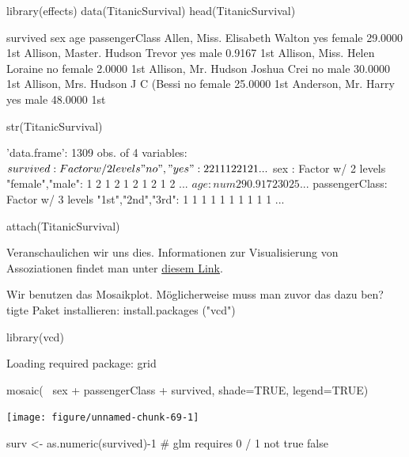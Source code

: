 \documentclass[a4paper,twoside]{tufte-book}\usepackage[]{graphicx}\usepackage[]{color}
\begin{document}
\begin{appendices}
\begin{Schunk}
\begin{Sinput}
library(effects) 
data(TitanicSurvival)
head(TitanicSurvival)
\end{Sinput}
\begin{Soutput}
                                survived    sex     age passengerClass
Allen, Miss. Elisabeth Walton        yes female 29.0000            1st
Allison, Master. Hudson Trevor       yes   male  0.9167            1st
Allison, Miss. Helen Loraine          no female  2.0000            1st
Allison, Mr. Hudson Joshua Crei       no   male 30.0000            1st
Allison, Mrs. Hudson J C (Bessi       no female 25.0000            1st
Anderson, Mr. Harry                  yes   male 48.0000            1st
\end{Soutput}
\begin{Sinput}
str(TitanicSurvival)
\end{Sinput}
\begin{Soutput}
'data.frame':	1309 obs. of  4 variables:
 $ survived      : Factor w/ 2 levels "no","yes": 2 2 1 1 1 2 2 1 2 1 ...
 $ sex           : Factor w/ 2 levels "female","male": 1 2 1 2 1 2 1 2 1 2 ...
 $ age           : num  29 0.917 2 30 25 ...
 $ passengerClass: Factor w/ 3 levels "1st","2nd","3rd": 1 1 1 1 1 1 1 1 1 1 ...
\end{Soutput}
\begin{Sinput}
attach(TitanicSurvival)
\end{Sinput}
\end{Schunk}


Veranschaulichen wir uns dies. Informationen zur Visualisierung von Assoziationen findet man unter \href{http://www.statmethods.net/advgraphs/mosaic.html}{diesem Link}.

Wir benutzen das Mosaikplot. Möglicherweise muss man zuvor das dazu ben?tigte Paket installieren: install.packages ("vcd")

\begin{Schunk}
\begin{Sinput}
library(vcd)
\end{Sinput}
\begin{Soutput}
Loading required package: grid
\end{Soutput}
\begin{Sinput}
mosaic(~ sex + passengerClass + survived, shade=TRUE, legend=TRUE) 
\end{Sinput}

\texttt{[image: figure/unnamed-chunk-69-1]} \begin{Sinput}
surv <- as.numeric(survived)-1 # glm requires 0 / 1 not true false
\end{Sinput}
\end{Schunk}



\end{appendices}
\end{document}
